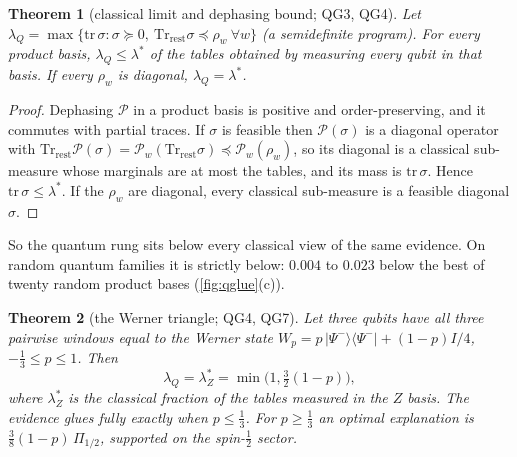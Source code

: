 \documentclass[11pt]{article}
\newtheorem{theorem}{Theorem}\newtheorem{proposition}[theorem]{Proposition}\newtheorem{corollary}[theorem]{Corollary}
\theoremstyle{definition}\newtheorem{definition}[theorem]{Definition}\newtheorem{remark}[theorem]{Remark}\newtheorem{example}[theorem]{Example}
\begin{document}
\begin{theorem}[classical limit and dephasing bound; QG3, QG4]\label{thm:dephase}
Let $\lambda_Q=\max\{\mathrm{tr}\,\sigma:\sigma\succeq0,\ \mathrm{Tr}_{\mathrm{rest}}\sigma\preceq\rho_w\ \forall w\}$ (a semidefinite program). For every
product basis, $\lambda_Q\le\lambda^*$ of the tables obtained by measuring every qubit in that basis. If every $\rho_w$ is diagonal,
$\lambda_Q=\lambda^*$.
\end{theorem}

\begin{proof}
Dephasing $\mathcal P$ in a product basis is positive and order-preserving, and it commutes with partial traces. If $\sigma$ is feasible then
$\mathcal P(\sigma)$ is a diagonal operator with $\mathrm{Tr}_{\mathrm{rest}}\mathcal P(\sigma)=\mathcal P_w(\mathrm{Tr}_{\mathrm{rest}}\sigma)\preceq
\mathcal P_w(\rho_w)$, so its diagonal is a classical sub-measure whose marginals are at most the tables, and its mass is $\mathrm{tr}\,\sigma$. Hence
$\mathrm{tr}\,\sigma\le\lambda^*$. If the $\rho_w$ are diagonal, every classical sub-measure is a feasible diagonal $\sigma$.
\end{proof}

So the quantum rung sits below every classical view of the same evidence. On random quantum families it is strictly below: $0.004$ to
$0.023$ below the best of twenty random product bases (\cref{fig:qglue}(c)).

\begin{theorem}[the Werner triangle; QG4, QG7]\label{thm:werner}
Let three qubits have all three pairwise windows equal to the Werner state $W_p=p\,|\Psi^-\rangle\langle\Psi^-|+(1-p)I/4$, $-\tfrac13\le p\le1$.
Then
\[
  \lambda_Q=\lambda^*_Z=\min\big(1,\tfrac32(1-p)\big),
\]
where $\lambda^*_Z$ is the classical fraction of the tables measured in the $Z$ basis. The evidence glues fully exactly when $p\le\tfrac13$.
For $p\ge\tfrac13$ an optimal explanation is $\tfrac38(1-p)\,\Pi_{1/2}$, supported on the spin-$\tfrac12$ sector.
\end{theorem}
\end{document}

